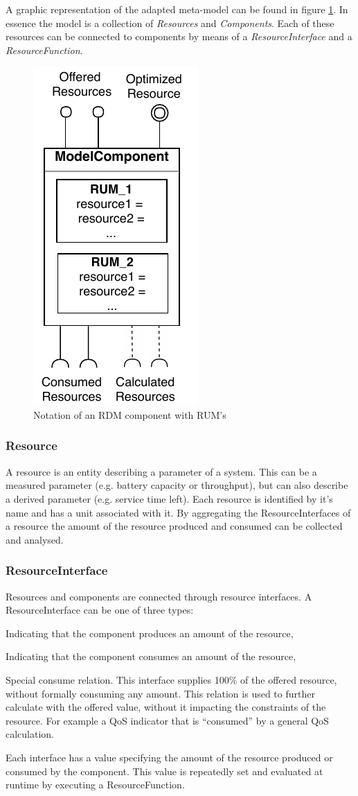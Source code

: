 A graphic representation of the adapted meta-model can be found in figure \ref{fig:component}. In essence the model is a collection of \emph{Resources} and \emph{Components}. Each of these resources can be connected to components by means of a \emph{ResourceInterface} and a \emph{ResourceFunction}. 
\begin{figure}
\centering
  \includegraphics[width=0.3\linewidth]{resources/img/component.pdf}
  \caption{Notation of an RDM component with RUM's}
  \label{fig:component}
\end{figure}

\subsubsection{Resource}
A resource is an entity describing a parameter of a system. This can be a measured parameter (e.g. battery capacity or throughput), but can also describe a derived parameter (e.g. service time left). Each resource is identified by it's name and has a unit associated with it. By aggregating the ResourceInterfaces of a resource the amount of the resource produced and consumed can be collected and analysed.

\subsubsection{ResourceInterface}
Resources and components are connected through resource interfaces. A ResourceInterface can be one of three types:
\begin{description}
\nospace
\item[Offer] Indicating that the component produces an amount of the resource,
\item[Consume] Indicating that the component consumes an amount of the resource,
\item[Calculate] Special consume relation. This interface supplies 100\% of the offered resource, without formally consuming any amount. This relation is used to further calculate with the offered value, without it impacting the constraints of the resource. For example a QoS indicator that is ``consumed'' by a general QoS calculation.
\end{description}
Each interface has a value specifying the amount of the resource produced or consumed by the component. This value is repeatedly set and evaluated at runtime by executing a ResourceFunction.

